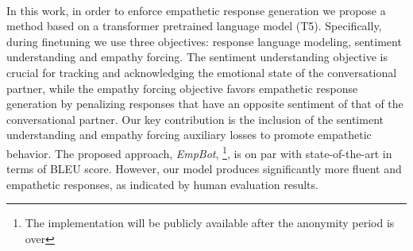 \documentclass[11pt]{article}
\begin{document}
\\In this work, in order to enforce empathetic response generation we propose a method based on a transformer pretrained language model (T5). Specifically, during finetuning we use three objectives: response language modeling, sentiment understanding and empathy forcing. The sentiment understanding objective is crucial for tracking and acknowledging the emotional state of the conversational partner, while the empathy forcing objective favors empathetic response generation by penalizing responses that have an opposite sentiment of that of the conversational partner.
Our key contribution is the inclusion of the sentiment understanding and empathy forcing auxiliary losses to promote empathetic behavior. The proposed approach, \textit{EmpBot}, \footnote{The implementation will be publicly available after the anonymity period is over}, is on par with state-of-the-art in terms of BLEU score. However, our model produces significantly more fluent and empathetic responses, as indicated by human evaluation results.

\end{document}

